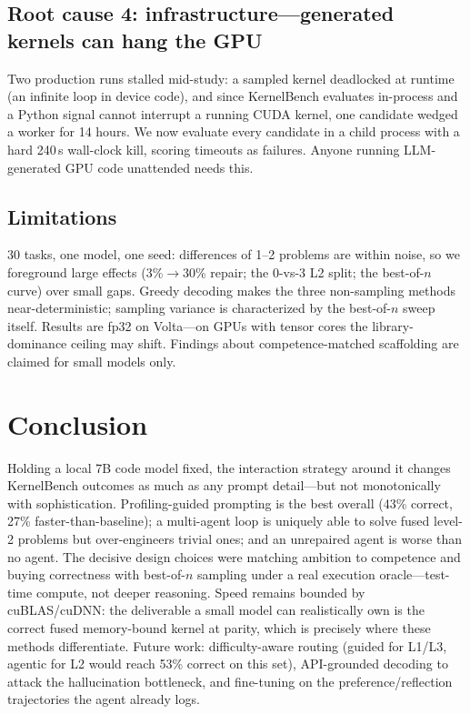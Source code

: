 \documentclass[conference]{IEEEtran}
\begin{document}
\subsection{Root cause 4: infrastructure---generated kernels can hang the GPU}
\label{sec:infra}

Two production runs stalled mid-study: a sampled kernel deadlocked at runtime
(an infinite loop in device code), and since KernelBench evaluates in-process and a
Python signal cannot interrupt a running CUDA kernel, one candidate wedged a worker
for 14 hours. We now evaluate every candidate in a child process with a hard 240\,s
wall-clock kill, scoring timeouts as failures. Anyone running LLM-generated GPU
code unattended needs this.

\subsection{Limitations}

30 tasks, one model, one seed: differences of 1--2 problems are within noise, so we
foreground large effects (3\%$\to$30\% repair; the 0-vs-3 L2 split; the
best-of-$n$ curve) over small gaps. Greedy decoding makes the three non-sampling
methods near-deterministic; sampling variance is characterized by the best-of-$n$
sweep itself. Results are fp32 on Volta---on GPUs with tensor cores the
library-dominance ceiling may shift. Findings about competence-matched scaffolding
are claimed for small models only.

\section{Conclusion}

Holding a local 7B code model fixed, the interaction strategy around it changes
KernelBench outcomes as much as any prompt detail---but not monotonically with
sophistication. Profiling-guided prompting is the best overall (43\% correct, 27\%
faster-than-baseline); a multi-agent loop is uniquely able to solve fused level-2
problems but over-engineers trivial ones; and an unrepaired agent is worse than no
agent. The decisive design choices were matching ambition to competence and buying
correctness with best-of-$n$ sampling under a real execution oracle---test-time
compute, not deeper reasoning. Speed remains bounded by cuBLAS/cuDNN: the
deliverable a small model can realistically own is the correct fused
memory-bound kernel at parity, which is precisely where these methods differentiate.
Future work: difficulty-aware routing (guided for L1/L3, agentic for L2 would reach
53\% correct on this set), API-grounded decoding to attack the hallucination
bottleneck, and fine-tuning on the preference/reflection trajectories the agent
already logs.
\end{document}
